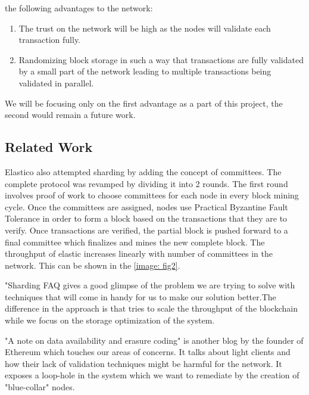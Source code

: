 \documentclass[conference]{IEEEtran}
\begin{document}
    the following advantages to the network:
    \begin{enumerate}[label=(\alph*)]
        \item The trust on the network will be high as the nodes will validate
            each transaction fully.
        \item Randomizing block storage in such a way that transactions are
            fully validated by a small part of the network leading to multiple
            transactions being validated in parallel.
    \end{enumerate}
    We will be focusing only on the first advantage as a part of this project,
    the second would remain a future work. \\

\subsection{Related Work}


Elastico \cite{elastico} also attempted sharding by adding the concept of
committees. The complete protocol was revamped by dividing it into 2 rounds. The
first round involves proof of work to choose committees for each node in every
block mining cycle. Once the committees are assigned, nodes use Practical
Byzantine Fault Tolerance \cite{pbft} in order to form a block based on the
transactions that they are to verify. Once transactions are verified, the partial
block is pushed forward to a final committee which finalizes and mines the new
complete block. The throughput of elastic \cite{elastico} increases linearly with
number of committees in the network. This can be shown in the \ref{image: fig2}.

"Sharding FAQ \cite{sharding} gives a good glimpse of the problem we are trying to
solve with techniques that will come in handy for us to make our solution
better.The difference in the approach is that \cite{sharding} tries to scale the
throughput of the blockchain while we focus on the storage optimization of the
system. 

"A note on data availability and erasure coding" \cite{erasureV} is another blog by
the founder of Ethereum \cite{ethY}\cite{ethW} which touches our areas of concerns. It talks
about light clients and how their lack of validation techniques might be harmful
for the network. It exposes a loop-hole in the system which we want to remediate
by the creation of "blue-collar" nodes.
\end{document}

